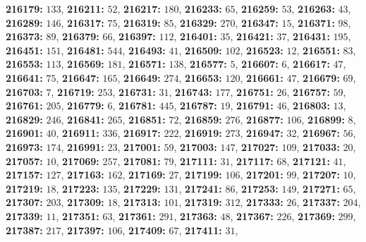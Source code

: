 \textsf{\bfseries 216179:} $133$, \textsf{\bfseries 216211:} $52$, \textsf{\bfseries 216217:} $180$, \textsf{\bfseries 216233:} $65$, \textsf{\bfseries 216259:} $53$, \textsf{\bfseries 216263:} $43$, \textsf{\bfseries 216289:} $146$, \textsf{\bfseries 216317:} $75$, \textsf{\bfseries 216319:} $85$, \textsf{\bfseries 216329:} $270$, \textsf{\bfseries 216347:} $15$, \textsf{\bfseries 216371:} $98$, \textsf{\bfseries 216373:} $89$, \textsf{\bfseries 216379:} $66$, \textsf{\bfseries 216397:} $112$, \textsf{\bfseries 216401:} $35$, \textsf{\bfseries 216421:} $37$, \textsf{\bfseries 216431:} $195$, \textsf{\bfseries 216451:} $151$, \textsf{\bfseries 216481:} $544$, \textsf{\bfseries 216493:} $41$, \textsf{\bfseries 216509:} $102$, \textsf{\bfseries 216523:} $12$, \textsf{\bfseries 216551:} $83$, \textsf{\bfseries 216553:} $113$, \textsf{\bfseries 216569:} $181$, \textsf{\bfseries 216571:} $138$, \textsf{\bfseries 216577:} $5$, \textsf{\bfseries 216607:} $6$, \textsf{\bfseries 216617:} $47$, \textsf{\bfseries 216641:} $75$, \textsf{\bfseries 216647:} $165$, \textsf{\bfseries 216649:} $274$, \textsf{\bfseries 216653:} $120$, \textsf{\bfseries 216661:} $47$, \textsf{\bfseries 216679:} $69$, \textsf{\bfseries 216703:} $7$, \textsf{\bfseries 216719:} $253$, \textsf{\bfseries 216731:} $31$, \textsf{\bfseries 216743:} $177$, \textsf{\bfseries 216751:} $26$, \textsf{\bfseries 216757:} $59$, \textsf{\bfseries 216761:} $205$, \textsf{\bfseries 216779:} $6$, \textsf{\bfseries 216781:} $445$, \textsf{\bfseries 216787:} $19$, \textsf{\bfseries 216791:} $46$, \textsf{\bfseries 216803:} $13$, \textsf{\bfseries 216829:} $246$, \textsf{\bfseries 216841:} $265$, \textsf{\bfseries 216851:} $72$, \textsf{\bfseries 216859:} $276$, \textsf{\bfseries 216877:} $106$, \textsf{\bfseries 216899:} $8$, \textsf{\bfseries 216901:} $40$, \textsf{\bfseries 216911:} $336$, \textsf{\bfseries 216917:} $222$, \textsf{\bfseries 216919:} $273$, \textsf{\bfseries 216947:} $32$, \textsf{\bfseries 216967:} $56$, \textsf{\bfseries 216973:} $174$, \textsf{\bfseries 216991:} $23$, \textsf{\bfseries 217001:} $59$, \textsf{\bfseries 217003:} $147$, \textsf{\bfseries 217027:} $109$, \textsf{\bfseries 217033:} $20$, \textsf{\bfseries 217057:} $10$, \textsf{\bfseries 217069:} $257$, \textsf{\bfseries 217081:} $79$, \textsf{\bfseries 217111:} $31$, \textsf{\bfseries 217117:} $68$, \textsf{\bfseries 217121:} $41$, \textsf{\bfseries 217157:} $127$, \textsf{\bfseries 217163:} $162$, \textsf{\bfseries 217169:} $27$, \textsf{\bfseries 217199:} $106$, \textsf{\bfseries 217201:} $99$, \textsf{\bfseries 217207:} $10$, \textsf{\bfseries 217219:} $18$, \textsf{\bfseries 217223:} $135$, \textsf{\bfseries 217229:} $131$, \textsf{\bfseries 217241:} $86$, \textsf{\bfseries 217253:} $149$, \textsf{\bfseries 217271:} $65$, \textsf{\bfseries 217307:} $203$, \textsf{\bfseries 217309:} $18$, \textsf{\bfseries 217313:} $101$, \textsf{\bfseries 217319:} $312$, \textsf{\bfseries 217333:} $26$, \textsf{\bfseries 217337:} $204$, \textsf{\bfseries 217339:} $11$, \textsf{\bfseries 217351:} $63$, \textsf{\bfseries 217361:} $291$, \textsf{\bfseries 217363:} $48$, \textsf{\bfseries 217367:} $226$, \textsf{\bfseries 217369:} $299$, \textsf{\bfseries 217387:} $217$, \textsf{\bfseries 217397:} $106$, \textsf{\bfseries 217409:} $67$, \textsf{\bfseries 217411:} $31$, 
